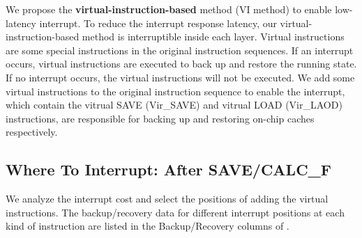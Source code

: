 
We propose the \textbf{virtual-instruction-based} method (VI method) to enable low-latency interrupt. 
To reduce the interrupt response latency, our virtual-instruction-based method is interruptible inside each layer. 
Virtual instructions are some special instructions in the original instruction sequences.
If an interrupt occurs, virtual instructions are executed to back up and restore the running state.
If no interrupt occurs, the virtual instructions will not be executed.
We add some virtual instructions to the original instruction sequence to enable the interrupt, which contain the vitrual SAVE (Vir\_SAVE) and vitrual LOAD  (Vir\_LAOD) instructions, are responsible for backing up and restoring on-chip caches respectively. 




\subsection{ Where To Interrupt: After SAVE/CALC\_F }
\label{sec:whereinter}
We analyze the interrupt cost and select the positions of adding the virtual instructions.
The backup/recovery data for different interrupt positions at each kind of instruction are listed in the Backup/Recovery columns of .

